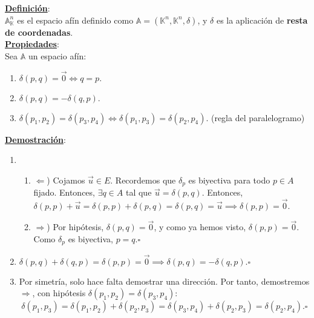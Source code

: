 \documentclass[11pt]{article}
\newcommand{\af}{\mathbb{A}}
\newcommand{\props}{\underline{\textbf{Propiedades}}:\\}
\newcommand{\defi}{\underline{\textbf{Definición}}:\\}
\newcommand{\dem}{\underline{\textbf{Demostración}}:\\}
\begin{document}
\defi $\af^n_{\mathbb{K}}$ es el espacio afín definido como $\af=(\mathbb{K}^n,\mathbb{K}^n,\delta)$, y $\delta$ es la aplicación de \textbf{resta de coordenadas}.\\
\props Sea $\af$ un espacio afín:
\begin{enumerate}
	\item $\delta(p,q)=\vec{0}\iff q=p.$
	\item $\delta(p,q)=-\delta(q,p).$
	\item $\delta(p_1,p_2)=\delta(p_3,p_4)\iff \delta(p_1,p_3)=\delta(p_2,p_4).$ (regla del paralelogramo)
\end{enumerate}
\dem
\begin{enumerate}
	\item \begin{enumerate}
		\item $\Leftarrow$) Cojamos $\vec{u}\in E$. Recordemos que $\delta_p$ es biyectiva para todo $p\in A$ fijado. Entonces, $\exists q\in A$ tal que $\vec{u}=\delta(p,q)$. Entonces, $\delta(p,p)+\vec{u}=\delta(p,p)+\delta(p,q)=\delta(p,q)=\vec{u}\implies\delta(p,p)=\vec{0}.$
		\item $\Rightarrow$) Por hipótesis, $\delta(p,q)=\vec{0}$, y como ya hemos visto, $\delta(p,p)=\vec{0}$. Como $\delta_p$ es biyectiva, $p=q.\square$
	\end{enumerate}
	\item $\delta(p,q)+\delta(q,p)=\delta(p,p)=\vec{0}\implies \delta(p,q)=-\delta(q,p).\square$
	\item Por simetría, solo hace falta demostrar una dirección. Por tanto, demostremos $\Rightarrow$, con hipótesis $\delta(p_1,p_2)=\delta(p_3,p_4)$:
	$$\delta(p_1,p_3)=\delta(p_1,p_2)+\delta(p_2,p_3)=\delta(p_3,p_4)+\delta(p_2,p_3)=\delta(p_2,p_4).\square$$
\end{enumerate}
\end{document}

